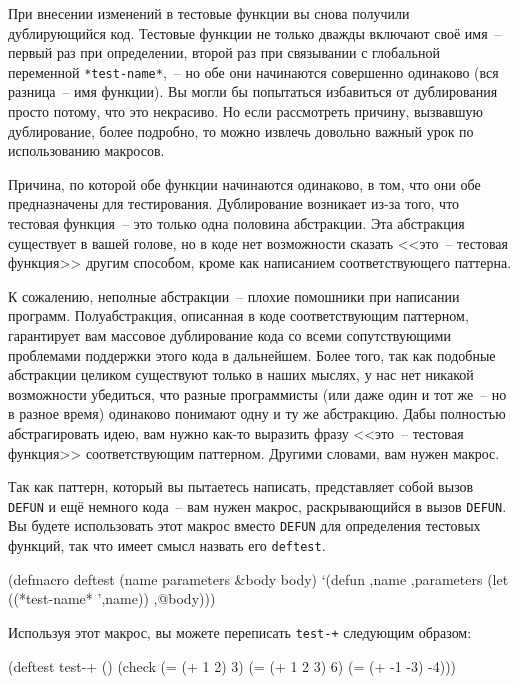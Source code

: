 При внесении изменений в тестовые функции вы снова получили дублирующийся код. Тестовые
функции не только дважды включают своё имя~-- первый раз при определении, второй раз при
связывании с глобальной переменной \lstinline{*test-name*},~-- но обе они начинаются совершенно
одинаково (вся разница~-- имя функции). Вы могли бы попытаться избавиться от
дублирования просто потому, что это некрасиво. Но если рассмотреть причину, вызвавшую
дублирование, более подробно, то можно извлечь довольно важный урок по использованию
макросов.

Причина, по которой обе функции начинаются одинаково, в том, что они обе предназначены для
тестирования. Дублирование возникает из-за того, что тестовая функция~-- это только одна
половина абстракции. Эта абстракция существует в вашей голове, но в коде нет возможности
сказать <<это~-- тестовая функция>> другим способом, кроме как написанием соответствующего
паттерна.

К сожалению, неполные абстракции~-- плохие помошники при написании
программ. Полуабстракция, описанная в коде соответствующим паттерном, гарантирует вам
массовое дублирование кода со всеми сопутствующими проблемами поддержки этого кода в
дальнейшем. Более того, так как подобные абстракции целиком существуют только в наших
мыслях, у нас нет никакой возможности убедиться, что разные программисты (или даже один и
тот же~-- но в разное время) одинаково понимают одну и ту же абстракцию. Дабы полностью
абстрагировать идею, вам нужно как-то выразить фразу <<это~-- тестовая функция>>
соответствующим паттерном. Другими словами, вам нужен макрос.

Так как паттерн, который вы пытаетесь написать, представляет собой вызов \lstinline{DEFUN}
и ещё немного кода~-- вам нужен макрос, раскрывающийся в вызов \lstinline{DEFUN}. Вы будете
использовать этот макрос вместо \lstinline{DEFUN} для определения тестовых функций, так что
имеет смысл назвать его \lstinline{deftest}.

\begin{myverb}
(defmacro deftest (name parameters &body body)
  `(defun ,name ,parameters
    (let ((*test-name* ',name))
      ,@body)))
\end{myverb}

Используя этот макрос, вы можете переписать \lstinline{test-+} следующим образом:

\begin{myverb}
(deftest test-+ ()
  (check
    (= (+ 1 2) 3)
    (= (+ 1 2 3) 6)
    (= (+ -1 -3) -4)))
\end{myverb}

